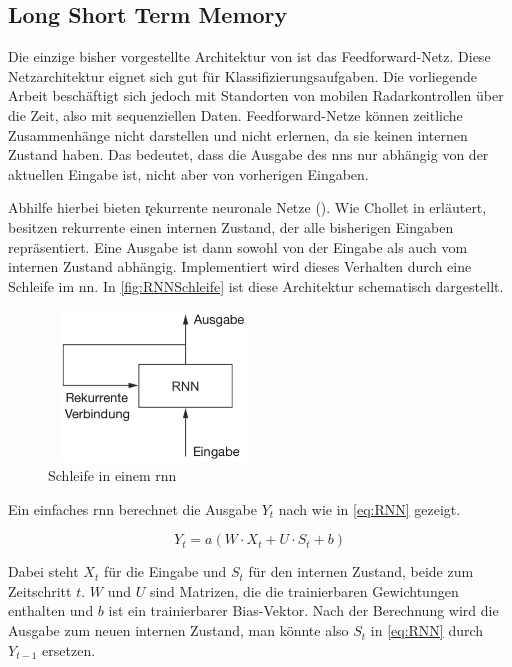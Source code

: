 \subsection{Long Short Term Memory}
\label{sec:LSTM}

Die einzige bisher vorgestellte Architektur von  ist das Feedforward-Netz.
Diese Netzarchitektur eignet sich gut für Klassifizierungsaufgaben.
Die vorliegende Arbeit beschäftigt sich jedoch mit Standorten von mobilen Radarkontrollen über die Zeit, also mit sequenziellen Daten.
Feedforward-Netze können zeitliche Zusammenhänge nicht darstellen und nicht erlernen, da sie keinen internen Zustand haben.
Das bedeutet, dass die Ausgabe des \acrshort{nn}s nur abhängig von der aktuellen Eingabe ist, nicht aber von vorherigen Eingaben.

Abhilfe hierbei bieten \k{rekurrente neuronale Netze} ().
Wie Chollet in \cite[S. 252]{DeepLearningPythonKeras} erläutert, besitzen rekurrente  einen internen Zustand, der alle bisherigen Eingaben repräsentiert.
Eine Ausgabe ist dann sowohl von der Eingabe als auch vom internen Zustand abhängig.
Implementiert wird dieses Verhalten durch eine Schleife im \acrshort{nn}.
In \autoref{fig:RNNSchleife} ist diese Architektur schematisch dargestellt.

\begin{figure}[h]
    \centering
    \includegraphics[width=0.5\textwidth,height=4cm,keepaspectratio=true]{content/images/RNNSchleife.png}
    \caption{Schleife in einem \acrshort{rnn} \cite[Abb. 6.9]{DeepLearningPythonKeras}}
    \label{fig:RNNSchleife}
\end{figure}

Ein einfaches \acrshort{rnn} berechnet die Ausgabe $Y_t$ nach \cite[S. 253]{DeepLearningPythonKeras} wie in \autoref{eq:RNN} gezeigt.

\begin{equation}
    Y_t = a(W \cdot X_t + U \cdot S_t + b)
\label{eq:RNN}
\end{equation}

Dabei steht $X_t$ für die Eingabe und $S_t$ für den internen Zustand, beide zum Zeitschritt $t$.
$W$ und $U$ sind Matrizen, die die trainierbaren Gewichtungen enthalten und $b$ ist ein trainierbarer Bias-Vektor.
Nach der Berechnung wird die Ausgabe zum neuen internen Zustand, man könnte also $S_t$ in \autoref{eq:RNN} durch $Y_{t-1}$ ersetzen.


